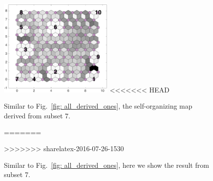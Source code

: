 \begin{figure}
        \centering
        \includegraphics[width=0.5\textwidth]{../../images0.01/M31/2D/image_subsets/subset7_dist_with_hits_t.png}
<<<<<<< HEAD
    \caption{Similar to Fig.~\ref{fig: all_derived_ones}, the self-organizing map derived  from subset 7.}
=======
    \caption{Similar to Fig.~\ref{fig: all_derived_ones}, here we show the result from subset 7.}
>>>>>>> sharelatex-2016-07-26-1530
    \label{fig: subset7}
\end{figure}
